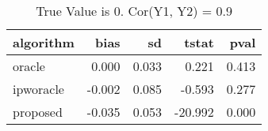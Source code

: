 \begin{table}[h!]
\caption{True Value is 0. Cor(Y1, Y2) = 0.9}
\centering
\begin{tabular}[t]{lrrrr}
\toprule
algorithm & bias & sd & tstat & pval\\
\midrule
oracle & 0.000 & 0.033 & 0.221 & 0.413\\
ipworacle & -0.002 & 0.085 & -0.593 & 0.277\\
proposed & -0.035 & 0.053 & -20.992 & 0.000\\
\bottomrule
\end{tabular}
\end{table}

